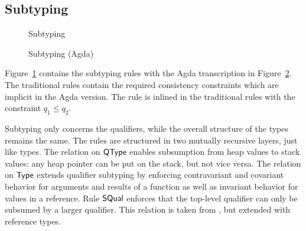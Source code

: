 \documentclass[sigplan,review,dvipsnames,screen,10pt]{acmart}
\begin{document}
\subsection{Subtyping}
\label{sec:subtyping}
\begin{figure}[tp]
  \caption{Subtyping}
  \label{fig:subtyping}
\end{figure}
\begin{figure}[tp]
  \SubtypingRelation  
  \caption{Subtyping (Agda)}
  \label{fig:subtyping-agda}
\end{figure}


Figure~\ref{fig:subtyping} contains the subtyping rules with the Agda
transcription in Figure~\ref{fig:subtyping-agda}. The traditional
rules contain the required consistency constraints which are implicit
in the Agda version. The {\ACSQual} rule is inlined in the traditional
rules with the constraint $q_1\le q_2$.

Subtyping
only concerns the qualifiers, while the overall structure of the types
remains the same. The rules are
structured in two mutually recursive layers, just like types. The
relation on $\AQType$ enables subsumption from heap values to stack
values: any heap pointer can be put on the stack, but not vice
versa. The relation on $\AType$ extends qualifier 
subtyping by enforcing contravariant and covariant
behavior for arguments and results of a function as well as invariant
behavior for values in a reference. Rule $\ACon{SQual}$ enforces that
the top-level qualifier can only be subsumed by a larger qualifier. This relation is taken from
\citet{DBLP:conf/ecoop/XhebrajB0R22}, but extended with reference types.
\end{document}
